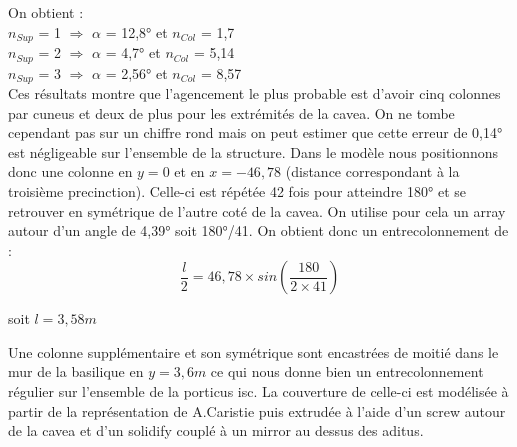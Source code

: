 On obtient : \\
$n_{Sup}$ = 1 $\Rightarrow$ $\alpha$ = 12,8° et $n_{Col}$ = 1,7 \\
$n_{Sup}$ = 2 $\Rightarrow$ $\alpha$ = 4,7° et $n_{Col}$ = 5,14 \\
$n_{Sup}$ = 3 $\Rightarrow$ $\alpha$ = 2,56° et $n_{Col}$ = 8,57 \\


Ces résultats montre que l'agencement le plus probable est d'avoir cinq colonnes par cuneus et deux de plus pour les extrémités de la cavea. On ne tombe cependant pas sur un chiffre rond mais on peut estimer que cette erreur  de 0,14° est négligeable sur l'ensemble de la structure. Dans le modèle nous positionnons donc une colonne en $y=0$ et en $x=-46,78$ (distance correspondant à la troisième precinction). Celle-ci est répétée 42 fois pour atteindre 180° et se retrouver en symétrique de l'autre coté de la cavea. On utilise pour cela un \gls{array} autour d'un angle de 4,39° soit 180°/41. On obtient donc un entrecolonnement de :
\begin{equation}
	\frac{l}{2} =  46,78 \times  sin(\frac{180}{2 \times 41}) 
\end{equation}
\begin{center}
	soit $l = 3,58m$
\end{center}	

Une colonne supplémentaire et son symétrique sont encastrées de moitié dans le mur de la basilique en $y=3,6m$ ce qui nous donne bien un entrecolonnement régulier sur l'ensemble de la \gls{porticus isc}. La couverture de celle-ci est modélisée à partir de la représentation de A.Caristie \cite[Pl. III et VI]{orangePl} puis extrudée à l'aide d'un \gls{screw} autour de la cavea et d'un \gls{solidify} couplé à un \gls{mirror} au dessus des aditus.



